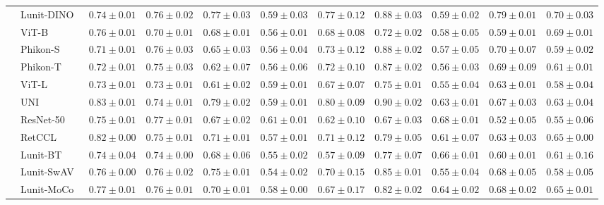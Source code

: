 \begin{tabular}{ll|cccc|c|cccc}
 & Lunit-DINO~\cite{kang2023benchmarking} & $0.74 \pm 0.01$ & $0.76 \pm 0.02$ & $0.77 \pm 0.03$ & $0.59 \pm 0.03$ & $0.77 \pm 0.12$ & $0.88 \pm 0.03$ & $0.59 \pm 0.02$ & $\mathbf{0.79 \pm 0.01}$ & $\mathbf{0.70 \pm 0.03}$ \\
 & ViT-B~\cite{kolesnikov2021image} & $0.76 \pm 0.01$ & $0.70 \pm 0.01$ & $0.68 \pm 0.01$ & $0.56 \pm 0.01$ & $0.68 \pm 0.08$ & $0.72 \pm 0.02$ & $0.58 \pm 0.05$ & $0.59 \pm 0.01$ & $0.69 \pm 0.01$ \\
 & Phikon-S~\cite{filiot2023scaling} & $0.71 \pm 0.01$ & $0.76 \pm 0.03$ & $0.65 \pm 0.03$ & $0.56 \pm 0.04$ & $0.73 \pm 0.12$ & $0.88 \pm 0.02$ & $0.57 \pm 0.05$ & $0.70 \pm 0.07$ & $0.59 \pm 0.02$ \\
 & Phikon-T~\cite{filiot2023scaling} & $0.72 \pm 0.01$ & $0.75 \pm 0.03$ & $0.62 \pm 0.07$ & $0.56 \pm 0.06$ & $0.72 \pm 0.10$ & $0.87 \pm 0.02$ & $0.56 \pm 0.03$ & $0.69 \pm 0.09$ & $0.61 \pm 0.01$ \\
 & ViT-L~\cite{kolesnikov2021image} & $0.73 \pm 0.01$ & $0.73 \pm 0.01$ & $0.61 \pm 0.02$ & $0.59 \pm 0.01$ & $0.67 \pm 0.07$ & $0.75 \pm 0.01$ & $0.55 \pm 0.04$ & $0.63 \pm 0.01$ & $0.58 \pm 0.04$ \\
 & UNI~\cite{chen2024uni} & $\mathbf{0.83 \pm 0.01}$ & $0.74 \pm 0.01$ & $\mathbf{0.79 \pm 0.02}$ & $0.59 \pm 0.01$ & $\mathbf{0.80 \pm 0.09}$ & $\mathbf{0.90 \pm 0.02}$ & $0.63 \pm 0.01$ & $0.67 \pm 0.03$ & $0.63 \pm 0.04$ \\
 & ResNet-50~\cite{he2015deep} & $0.75 \pm 0.01$ & $\mathbf{0.77 \pm 0.01}$ & $0.67 \pm 0.02$ & $0.61 \pm 0.01$ & $0.62 \pm 0.10$ & $0.67 \pm 0.03$ & $\mathbf{0.68 \pm 0.01}$ & $0.52 \pm 0.05$ & $0.55 \pm 0.06$ \\
 & RetCCL~\cite{wang2023retccl} & $0.82 \pm 0.00$ & $0.75 \pm 0.01$ & $0.71 \pm 0.01$ & $0.57 \pm 0.01$ & $0.71 \pm 0.12$ & $0.79 \pm 0.05$ & $0.61 \pm 0.07$ & $0.63 \pm 0.03$ & $0.65 \pm 0.00$ \\
 & Lunit-BT~\cite{kang2023benchmarking} & $0.74 \pm 0.04$ & $0.74 \pm 0.00$ & $0.68 \pm 0.06$ & $0.55 \pm 0.02$ & $0.57 \pm 0.09$ & $0.77 \pm 0.07$ & $0.66 \pm 0.01$ & $0.60 \pm 0.01$ & $0.61 \pm 0.16$ \\
 & Lunit-SwAV~\cite{kang2023benchmarking} & $0.76 \pm 0.00$ & $0.76 \pm 0.02$ & $0.75 \pm 0.01$ & $0.54 \pm 0.02$ & $0.70 \pm 0.15$ & $0.85 \pm 0.01$ & $0.55 \pm 0.04$ & $0.68 \pm 0.05$ & $0.58 \pm 0.05$ \\
 & Lunit-MoCo~\cite{kang2023benchmarking} & $0.77 \pm 0.01$ & $0.76 \pm 0.01$ & $0.70 \pm 0.01$ & $0.58 \pm 0.00$ & $0.67 \pm 0.17$ & $0.82 \pm 0.02$ & $0.64 \pm 0.02$ & $0.68 \pm 0.02$ & $0.65 \pm 0.01$ \\
\cline{1-11}
\bottomrule
\end{tabular}
